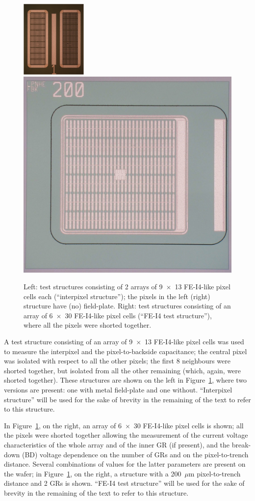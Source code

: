  \begin{figure}[!htbp]
\begin{center}
\includegraphics[width=0.29\textwidth]{pixel_cap_struct.png}
\includegraphics[height=0.335\textwidth]{testStruct.png}
\caption{\label{fig:pix_cap_struct}Left: test structures consisting of 2 arrays of 9~$\times$~13 FE-I4-like pixel cells each (``interpixel structure'');
the pixels in the left (right) structure have (no) field-plate.
Right: test structures consisting of an array of 6~$\times$~30 FE-I4-like
 pixel cells (``FE-I4 test structure''), where  all the pixels were shorted together.}
\end{center}
\end{figure}

 A test structure consisting of an array
 of 9~$\times$~13 FE-I4-like pixel cells was used to measure the interpixel  and the pixel-to-backside capacitance; the central pixel was isolated with respect to all the other pixels;
 the first 8 neighbours were shorted together, but isolated from all the other remaining (which, again,  were shorted together). These structures are shown on the
 left in Figure~\ref{fig:pix_cap_struct}, where two versions are present: one with metal field-plate and one without. ``Interpixel structure'' will be used for the sake of
 brevity in the remaining of the text to refer to this structure.


In Figure~\ref{fig:pix_cap_struct}, on the right, an array of 6~$\times$~30 FE-I4-like
 pixel cells is shown; all the pixels were shorted together allowing the measurement of the current voltage characteristics  of the whole array and of the inner GR (if present),
 and the break-down (BD) voltage dependence on
 the number of GRs and on the pixel-to-trench distance. Several combinations of values for the latter parameters are present on the wafer; in
 Figure~\ref{fig:pix_cap_struct}, on the right, a structure with a 200~$\mu$m pixel-to-trench distance and 2 GRs is shown. ``FE-I4 test structure'' will be used for the sake of
 brevity in the remaining of the text to refer to this structure.

